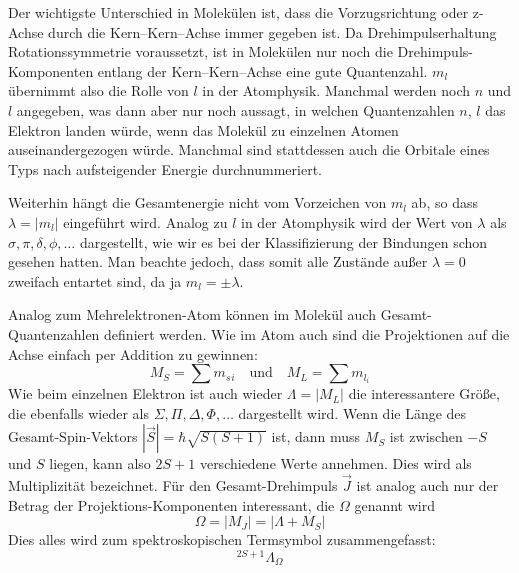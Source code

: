 Der wichtigste Unterschied in Molekülen ist, dass die Vorzugsrichtung oder z-Achse durch die Kern--Kern--Achse immer gegeben ist. Da Drehimpulserhaltung Rotationssymmetrie voraussetzt, ist in Molekülen nur noch die Drehimpuls-Komponenten entlang der Kern--Kern--Achse eine gute Quantenzahl. $m_l$ übernimmt also die Rolle von $l$ in der Atomphysik. Manchmal werden noch $n$ und  $l$  angegeben, was dann  aber nur noch aussagt, in welchen Quantenzahlen $n$, $l$ das Elektron landen würde, wenn das Molekül zu einzelnen Atomen auseinandergezogen würde. Manchmal sind stattdessen auch die Orbitale eines Typs nach aufsteigender Energie durchnummeriert.

Weiterhin hängt die Gesamtenergie nicht vom Vorzeichen von $m_l$ ab, so dass $\lambda = | m_l | $ eingeführt wird. Analog zu $l$ in der Atomphysik wird der Wert von $\lambda$ als $\sigma, \pi, \delta, \phi, \dots$ dargestellt, wie wir es bei der Klassifizierung der Bindungen schon gesehen hatten. Man beachte jedoch, dass somit alle Zustände außer $\lambda = 0$ zweifach entartet sind, da ja $m_l = \pm \lambda$.


Analog zum Mehrelektronen-Atom können im Molekül auch Gesamt-Quantenzahlen definiert werden. Wie im Atom auch sind die Projektionen auf die Achse einfach per Addition zu gewinnen:
\begin{equation}
M_S = \sum m_s{_i} \quad \text{und} \quad M_L  = \sum m_{l_i}
\end{equation}
Wie beim einzelnen Elektron ist auch wieder $\Lambda = | M_L|$ die interessantere Größe, die ebenfalls wieder als $\Sigma, \Pi, \Delta, \Phi, \dots$ dargestellt wird. Wenn die Länge des Gesamt-Spin-Vektors $|\vec{S}| = \hbar \sqrt{S (S+1)}$ ist, dann muss  $M_S$ ist zwischen $-S$ und $S$ liegen, kann also  $2S + 1$  verschiedene Werte annehmen. Dies wird als Multiplizität bezeichnet. Für den Gesamt-Drehimpuls $\vec{J}$ ist analog auch nur der Betrag der Projektions-Komponenten interessant, die $\Omega$ genannt wird
\begin{equation}
 \Omega = | M_J | = | \Lambda + M_S|
\end{equation}
Dies alles wird zum spektroskopischen Termsymbol zusammengefasst:
\begin{equation}
 ^{2 S + 1}\Lambda_\Omega
\end{equation}


